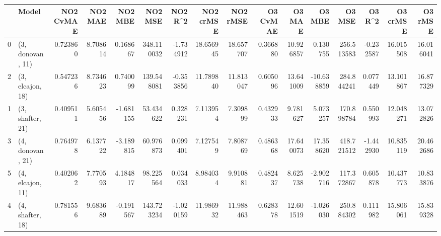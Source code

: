 \begin{tabular}{llrrrrrrrrrrrrrr}
\toprule
{} &             Model &  NO2 CvMAE &   NO2 MAE &   NO2 MBE &     NO2 MSE &   NO2 R\textasciicircum2 &  NO2 crMSE &   NO2 rMSE &  O3 CvMAE &     O3 MAE &     O3 MBE &      O3 MSE &    O3 R\textasciicircum2 &   O3 crMSE &    O3 rMSE \\
\midrule
0 &  (3, donovan, 11) &   0.723860 &  8.708614 &  0.168667 &  348.110032 & -1.734912 &  18.656945 &  18.657707 &  0.366880 &  10.926857 &   0.130755 &  256.513583 & -0.232587 &  16.015508 &  16.016041 \\
2 &  (3, elcajon, 18) &   0.547236 &  8.734623 &  0.740099 &  139.548081 & -0.353856 &  11.789840 &  11.813047 &  0.605096 &  13.641009 & -10.638859 &  284.844241 &  0.077449 &  13.101867 &  16.877329 \\
1 &  (3, shafter, 21) &   0.409511 &  5.605456 & -1.681155 &   53.434622 &  0.328231 &   7.113954 &   7.309899 &  0.432933 &   9.781627 &   5.073257 &  170.898784 &  0.550993 &  12.048271 &  13.072826 \\
3 &  (4, donovan, 21) &   0.764978 &  6.137722 & -3.189815 &   60.976873 &  0.099401 &   7.127549 &   7.808769 &  0.486368 &  17.640073 &  17.358620 &  418.721512 & -1.442930 &  10.835119 &  20.462686 \\
5 &  (4, elcajon, 11) &   0.402062 &  7.770593 &  4.184817 &   98.225564 &  0.034033 &   8.984034 &   9.910881 &  0.482437 &   8.625738 &  -2.902716 &  117.372867 &  0.605878 &  10.437773 &  10.833876 \\
4 &  (4, shafter, 18) &   0.781556 &  9.683689 & -0.191567 &  143.723234 & -1.020159 &  11.986932 &  11.988463 &  0.628378 &  12.601519 &  -1.026030 &  250.884302 &  0.111982 &  15.806061 &  15.839328 \\
\bottomrule
\end{tabular}
